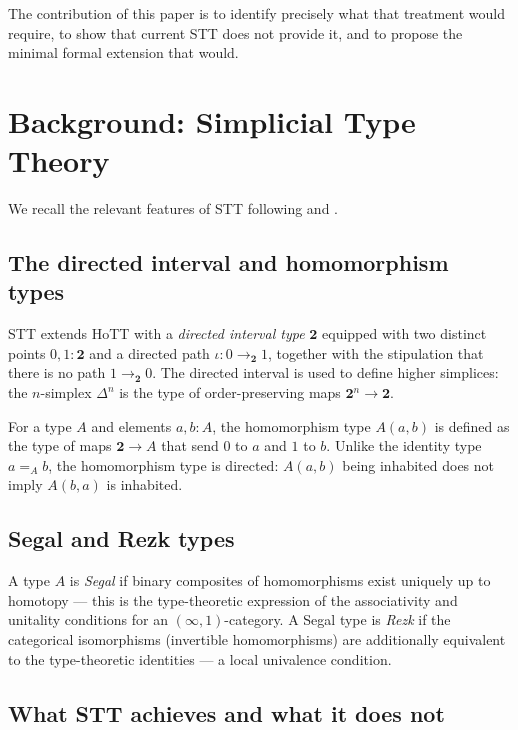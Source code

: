 \documentclass[12pt]{article}
\theoremstyle{definition}
\theoremstyle{remark}
\newcommand{\Hom}[3]{#1(#2, #3)}
\begin{document}
The contribution of this paper is to identify precisely what that treatment would require, to show that current STT does not provide it, and to propose the minimal formal extension that would.

\section{Background: Simplicial Type Theory}

We recall the relevant features of STT following \cite{riehl-shulman2017} and \cite{gratzer-weinberger-buchholtz2024}.

\subsection{The directed interval and homomorphism types}

STT extends HoTT with a \textit{directed interval type} $\mathbf{2}$ equipped with two distinct points $0, 1 : \mathbf{2}$ and a directed path $\iota : 0 \to_\mathbf{2} 1$, together with the stipulation that there is no path $1 \to_\mathbf{2} 0$. The directed interval is used to define higher simplices: the $n$-simplex $\Delta^n$ is the type of order-preserving maps $\mathbf{2}^n \to \mathbf{2}$.

For a type $A$ and elements $a, b : A$, the homomorphism type $\Hom{A}{a}{b}$ is defined as the type of maps $\mathbf{2} \to A$ that send $0$ to $a$ and $1$ to $b$. Unlike the identity type $a =_A b$, the homomorphism type is directed: $\Hom{A}{a}{b}$ being inhabited does not imply $\Hom{A}{b}{a}$ is inhabited.

\subsection{Segal and Rezk types}

A type $A$ is \textit{Segal} if binary composites of homomorphisms exist uniquely up to homotopy --- this is the type-theoretic expression of the associativity and unitality conditions for an $(\infty, 1)$-category. A Segal type is \textit{Rezk} if the categorical isomorphisms (invertible homomorphisms) are additionally equivalent to the type-theoretic identities --- a local univalence condition.

\subsection{What STT achieves and what it does not}
\end{document}
